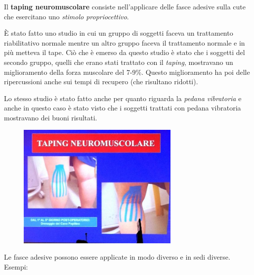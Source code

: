 Il \textbf{taping neuromuscolare} consiste nell'applicare delle fasce
adesive sulla cute che esercitano uno \emph{stimolo propriocettivo}.

È stato fatto uno studio in cui un gruppo di soggetti faceva un
trattamento riabilitativo normale mentre un altro gruppo faceva il
trattamento normale e in più metteva il tape. Ciò che è emerso da questo
studio è stato che i soggetti del secondo gruppo, quelli che erano stati
trattato con il \emph{taping}, mostravano un miglioramento della forza
muscolare del 7-9\%. Questo miglioramento ha poi delle ripercussioni
anche sui tempi di recupero (che risultano ridotti).

Lo stesso studio è stato fatto anche per quanto riguarda la \emph{pedana
vibratoria} e anche in questo caso è stato visto che i soggetti trattati
con pedana vibratoria mostravano dei buoni risultati.

\begin{figure}[!ht]
\centering
	\includegraphics[width=0.7\textwidth]{030/image17.jpeg}
\end{figure}

Le fasce adesive possono essere applicate in modo diverso e in sedi
diverse. Esempi:

